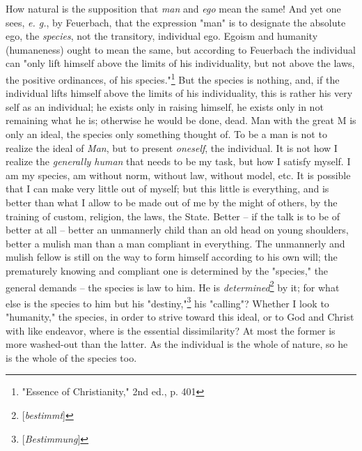 How natural is the supposition that \textit{man} and \textit{ego} mean the 
same! And yet one sees, \textit{e. g.}, by Feuerbach, that the expression 
"{}man"{} is to designate the absolute ego, the \textit{species}, not the 
transitory, individual ego. Egoism and humanity (humaneness) ought to mean the 
same, but according to Feuerbach the individual can "{}only lift himself above 
the limits of his individuality, but not above the laws, the positive 
ordinances, of his species."{}\footnote{"{}Essence of Christianity,"{} 2nd 
ed., p. 401} But the species is nothing, and, if the individual lifts himself 
above the limits of his individuality, this is rather his very self as an 
individual; he exists only in raising himself, he exists only in not remaining 
what he is; otherwise he would be done, dead. Man with the great M is only an 
ideal, the species only something thought of. To be a man is not to realize 
the ideal of \textit{Man}, but to present \textit{oneself}, the individual. It 
is not how I realize the \textit{generally human} that needs to be my task, 
but how I satisfy myself. I am my species, am without norm, without law, 
without model, etc. It is possible that I can make very little out of myself; 
but this little is everything, and is better than what I allow to be made out 
of me by the might of others, by the training of custom, religion, the laws, 
the State. Better -- if the talk is to be of better at all -- better an 
unmannerly child than an old head on young shoulders, better a mulish man than 
a man compliant in everything. The unmannerly and mulish fellow is still on 
the way to form himself according to his own will; the prematurely knowing and 
compliant one is determined by the "{}species,"{} the general demands -- the 
species is law to him. He is \textit{determined}\footnote{[\textit{bestimmt}]} 
by it; for what else is the species to him but his 
"{}destiny,"{}\footnote{[\textit{Bestimmung}]} his "{}calling"{}? Whether I 
look to "{}humanity,"{} the species, in order to strive toward this ideal, or 
to God and Christ with like endeavor, where is the essential dissimilarity? At 
most the former is more washed-out than the latter. As the individual is the 
whole of nature, so he is the whole of the species too.

